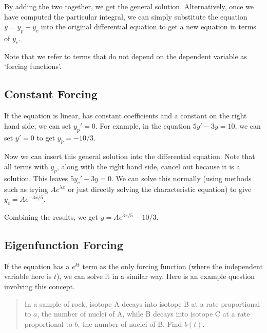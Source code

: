 \documentclass{article}
\begin{document}
By adding the two together, we get the general solution. Alternatively, once we have computed the particular integral, we can simply substitute the equation $y = y_p + y_c$ into the original differential equation to get a new equation in terms of $y_c$.

Note that we refer to terms that do not depend on the dependent variable as `forcing functions'.

\subsection{Constant Forcing}
If the equation is linear, has constant coefficients and a constant on the right hand side, we can set $y_p' = 0$. For example, in the equation $5y' - 3y = 10$, we can set $y' = 0$ to get $y_p = -10/3$.

Now we can insert this general solution into the differential equation. Note that all terms with $y_p$, along with the right hand side, cancel out because it is a solution. This leaves $5y_c' - 3y = 0$. We can solve this normally (using methods such as trying $Ae^{\lambda x}$ or just directly solving the characteristic equation) to give $y_c = Ae^{-3x/5}$.

Combining the results, we get $y = Ae^{3x/5} - 10/3$.

\subsection{Eigenfunction Forcing}
If the equation has a $e^{kt}$ term as the only forcing function (where the independent variable here is $t$), we can solve it in a similar way. Here is an example question involving this concept.

\begin{quote}
    In a sample of rock, isotope A decays into isotope B at a rate proportional to $a$, the number of nuclei of A, while B decays into isotope C at a rate proportional to $b$, the number of nuclei of B. Find $b(t)$.
\end{quote}
\end{document}
